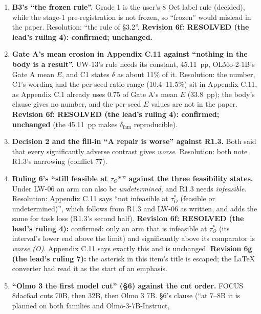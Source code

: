 \documentclass{article}
\theoremstyle{plain}
\theoremstyle{definition}
\theoremstyle{remark}
\begin{document}
\begin{enumerate}
        the plant as PKU red-team prompts with PKU-safe, non-refusing answers.
  \item \textbf{B3's ``the frozen rule''.} Grade 1 is the user's 8 Oct label
        rule (decided), while the stage-1 pre-registration is not frozen, so
        ``frozen'' would mislead in the paper. Resolution: ``the rule of
        \S{}3.2''. \textbf{Revision 6f: RESOLVED (the lead's ruling 4):
        confirmed; unchanged.}
  \item \textbf{Gate A's mean erosion in Appendix C.11 against ``nothing in the
        body is a result''.} UW-13's rule needs its constant, 45.11~pp,
        OLMo-2-1B's Gate A mean $E$, and C1 states $\delta$ as about 11\% of it.
        Resolution: the number, C1's wording and the per-seed ratio range
        (10.4--11.5\%) sit in Appendix C.11, as Appendix C.1 already uses 0.75
        of Gate A's mean $E$ (33.8~pp); the body's clause gives no number, and
        the per-seed $E$ values are not in the paper. \textbf{Revision 6f:
        RESOLVED (the lead's ruling 4): confirmed; unchanged} (the 45.11~pp
        makes $\delta_{\mathrm{fam}}$ reproducible).
  \item \textbf{Decision 2 and the fill-in ``A repair is worse'' against R1.3.}
        Both said that every significantly adverse contrast gives \emph{worse}.
        Resolution: both note R1.3's narrowing (conflict 77).
  \item \textbf{Ruling 6's ``still feasible at $\tau_{O}$*'' against the three
        feasibility states.} Under LW-06 an arm can also be \emph{undetermined},
        and R1.3 needs \emph{infeasible}. Resolution: Appendix C.11 says ``not
        infeasible at $\tau_O^*$ (feasible or undetermined)'', which follows
        from R1.3 and LW-06 as written, and adds the same for task loss (R1.3's
        second half). \textbf{Revision 6f: RESOLVED (the lead's ruling 4):}
        confirmed: only an arm that is infeasible at $\tau_O^*$ (its interval's
        lower end above the limit) and significantly above its comparator is
        \emph{worse (O)}. Appendix C.11 says exactly this and is unchanged.
        \textbf{Revision 6g (the lead's ruling 7):} the asterisk in this item's
        title is escaped; the LaTeX converter had read it as the start of an
        emphasis.
  \item \textbf{``Olmo 3 the first model cut'' (\S{}6) against the cut order.}
        FOCUS 8dac6ad cuts 70B, then 32B, then Olmo 3 7B. \S{}6's clause (``at
        7--8B it is planned on both families and Olmo-3-7B-Instruct,

\end{enumerate}
\end{document}
